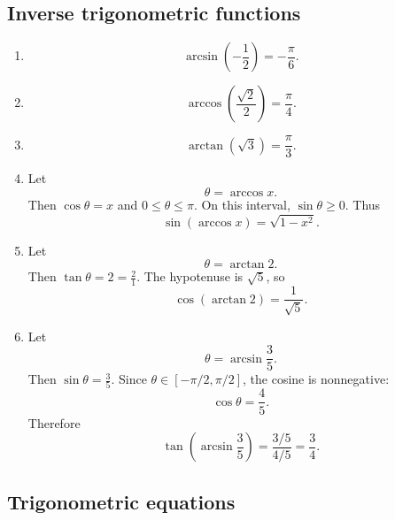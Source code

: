 \subsection*{Inverse trigonometric functions}

\begin{enumerate}
\item
\[
\arcsin\left(-\frac12\right)=-\frac{\pi}{6}.
\]

\item
\[
\arccos\left(\frac{\sqrt2}{2}\right)=\frac{\pi}{4}.
\]

\item
\[
\arctan(\sqrt3)=\frac{\pi}{3}.
\]

\item
Let
\[
\theta=\arccos x.
\]
Then \(\cos\theta=x\) and \(0\le\theta\le\pi\).  On this interval, \(\sin\theta\ge0\).
Thus
\[
\sin(\arccos x)=\sqrt{1-x^2}.
\]

\item
Let
\[
\theta=\arctan 2.
\]
Then \(\tan\theta=2=\frac{2}{1}\).  The hypotenuse is \(\sqrt5\), so
\[
\cos(\arctan 2)=\frac1{\sqrt5}.
\]

\item
Let
\[
\theta=\arcsin\frac35.
\]
Then \(\sin\theta=\frac35\).  Since \(\theta\in[-\pi/2,\pi/2]\), the cosine is
nonnegative:
\[
\cos\theta=\frac45.
\]
Therefore
\[
\tan\left(\arcsin\frac35\right)
=
\frac{3/5}{4/5}
=
\frac34.
\]
\end{enumerate}

\subsection*{Trigonometric equations}

